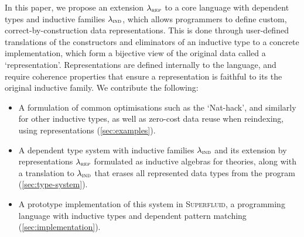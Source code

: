 In this paper, we propose an extension $\lambda_{\textsc{rep}}$ to a core language with
dependent types and inductive families $\lambda_{\textsc{ind}}$, which allows programmers to
define custom, correct-by-construction data representations. This is done
through user-defined translations of the constructors and eliminators of an
inductive type to a concrete implementation, which form a bijective view of the
original data called a `representation'. Representations are defined internally
to the language, and require coherence properties that ensure a representation
is faithful to its the original inductive family. We contribute the following:
\begin{itemize}
    \item A formulation of common optimisations such as the `Nat-hack', and
        similarly for other inductive types, as well as zero-cost data reuse when
        reindexing, using representations (\cref{sec:examples}).
    \item A dependent type system with inductive families $\lambda_{\textsc{ind}}$ and its
        extension by representations $\lambda_{\textsc{rep}}$ formulated as inductive algebras
        for theories, along with a translation to $\lambda_{\textsc{ind}}$ that erases all
        represented data types from the program (\cref{sec:type-system}).
        \item A prototype implementation of this system in \textsc{Superfluid},
        a programming language with inductive types and dependent pattern
        matching (\cref{sec:implementation}).
\end{itemize}
